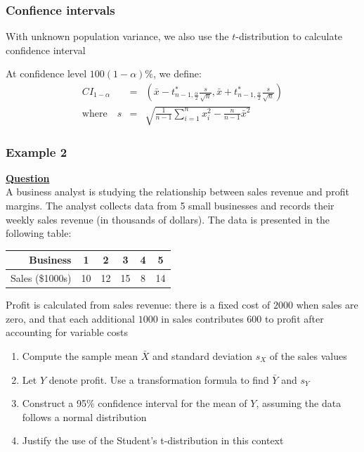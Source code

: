 \documentclass[t,8pt]{beamer}%
\begin{document}
\begin{frame}
	\frametitle{Confience intervals} 
	With unknown population variance, we also use the $t$-distribution to calculate confidence interval \par
    At confidence level $100(1-\alpha)\%$, we define:
    \begin{eqnarray*}
        CI_{1-\alpha}&=&\left(\bar x-t^*_{n-1,\frac{\alpha}{2}}\frac s{\sqrt n},\bar x+t^*_{n-1,\frac{\alpha}{2}}\frac s{\sqrt n}\right) \\
        \text{where}\quad s&=&\sqrt{\frac 1{n-1}\sum_{i=1}^nx_i^2-\frac n{n-1}\bar x^2}
    \end{eqnarray*}

    
\end{frame}

\begin{frame}
	\frametitle{Example 2}
    {\bf\underline{Question}} \\
    A business analyst is studying the relationship between sales revenue and profit margins. The analyst collects data from 5 small businesses and records their weekly sales revenue (in thousands of dollars). The data is presented in the following table:
    \begin{table}[h]
        \centering
        \begin{tabular}{r|ccccc}
            \hline
            Business & 1 & 2 & 3 & 4 & 5 \\
            \hline
            Sales (\$1000s) & 10 & 12 & 15 & 8 & 14 \\
            \hline
        \end{tabular}
    \end{table}
    Profit is calculated from sales revenue: there is a fixed cost of $2000$ when sales are zero, and that each additional $1000$ in sales contributes $600$ to profit after accounting for variable costs
    \begin{enumerate}
        \item Compute the sample mean \( \bar{X} \) and standard deviation \( s_X \) of the sales values
        \item Let $Y$ denote profit. Use a transformation formula to find \( \bar{Y} \) and \( s_Y \)
        \item Construct a 95\% confidence interval for the mean of \( Y \), assuming the data follows a normal distribution
        \item Justify the use of the Student’s t-distribution in this context
    \end{enumerate}
\end{frame}
\end{document}
